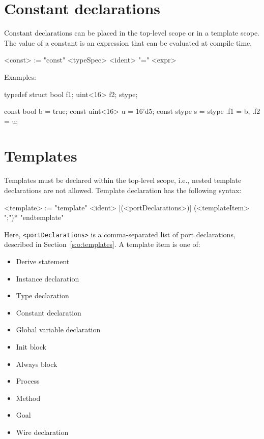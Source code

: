 \documentclass{report}
\newcommand{\src}[1]{\texttt{#1}}
\begin{document}
\section{Constant declarations}\label{s:r:constant}

Constant declarations can be placed in the top-level scope or in a
template scope.  The value of a constant is an expression that can
be evaluated at compile time.

\begin{bnflisting}{}
<const> := "const" <typeSpec> <ident> "=" <expr>
\end{bnflisting}

Examples:

\begin{tsllisting}{}
typedef struct {bool f1; uint<16> f2;} stype;

const bool     b = true;
const uint<16> u = 16'd5;
const stype    s = stype {.f1 = b, .f2 = u};
\end{tsllisting}


\section{Templates}

Templates must be declared within the top-level scope, i.e., 
nested template declarations are not allowed.  Template 
declaration has the following syntax:
\begin{bnflisting}{}
<template> := "template" <ident> [(<portDeclarations>)]
                  (<templateItem> ";")*
              "endtemplate"
\end{bnflisting}
Here, \src{<portDeclarations>} is a comma-separated list of port 
declarations, described in Section~\ref{s:o:templates}.  A 
template item is one of:
\begin{itemize}
    \item Derive statement
    \item Instance declaration
    \item Type declaration
    \item Constant declaration
    \item Global variable declaration
    \item Init block
    \item Always block
    \item Process
    \item Method
    \item Goal
    \item Wire declaration
\end{itemize}
\end{document}
